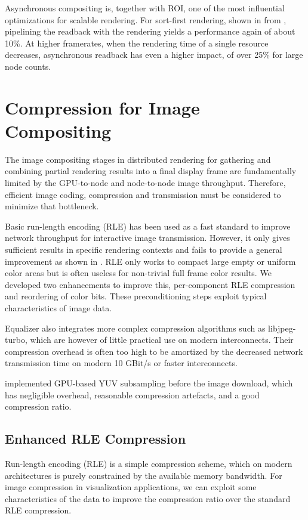 Asynchronous compositing is, together with ROI, one of the most influential
optimizations for scalable rendering. For sort-first rendering, shown in
 from \cite{EBAHMP:12}, pipelining the readback with the rendering
yields a performance again of about 10\%. At higher framerates, when the
rendering time of a single resource decreases, asynchronous readback has even a
higher impact, of over 25\% for large node counts.


\section{Compression for Image Compositing}

The image compositing stages in distributed rendering for gathering and
combining partial rendering results into a final display frame are fundamentally
limited by the GPU-to-node and node-to-node image throughput. Therefore,
efficient image coding, compression and transmission must be considered to
minimize that bottleneck.

Basic run-length encoding (RLE) has been used as a fast standard to improve
network throughput for interactive image transmission. However, it only gives
sufficient results in specific rendering contexts and fails to provide a
general improvement as shown in \cite{MEP:10}. RLE only works to compact large
empty or uniform color areas but is often useless for non-trivial full frame
color results. We developed two enhancements to improve this, per-component RLE
compression and reordering of color bits. These preconditioning steps exploit
typical characteristics of image data.

Equalizer also integrates more complex compression algorithms such as
\textsf{libjpeg-turbo}, which are however of little practical use on modern
interconnects. Their compression overhead is often too high to be amortized by
the decreased network transmission time on modern 10 GBit/s or faster
interconnects.

\cite{MEP:10} implemented GPU-based YUV subsampling before the image download,
which has negligible overhead, reasonable compression artefacts, and a good
compression ratio.

\subsection{Enhanced RLE Compression}

Run-length encoding (RLE) is a simple compression scheme, which on modern
architectures is purely constrained by the available memory bandwidth. For image
compression in visualization applications, we can exploit some characteristics
of the data to improve the compression ratio over the standard RLE compression.

